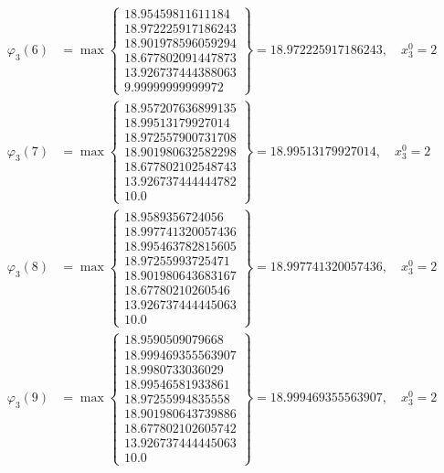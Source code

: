 \documentclass{article}
\begin{document}
\begin{align*}
  
\varphi_{3}(6) &= \max \left\{ \begin{array}{c}
18.95459811611184 \\
 18.972225917186243 \\
 18.901978596059294 \\
 18.677802091447873 \\
 13.926737444388063 \\
 9.99999999999972
\end{array} \right\} = 18.972225917186243, \quad x_{3}^0 = 2\\
  
  
  
  
\varphi_{3}(7) &= \max \left\{ \begin{array}{c}
18.957207636899135 \\
 18.99513179927014 \\
 18.972557900731708 \\
 18.901980632582298 \\
 18.677802102548743 \\
 13.926737444444782 \\
 10.0
\end{array} \right\} = 18.99513179927014, \quad x_{3}^0 = 2\\
  
  
  
  
\varphi_{3}(8) &= \max \left\{ \begin{array}{c}
18.9589356724056 \\
 18.997741320057436 \\
 18.995463782815605 \\
 18.97255993725471 \\
 18.901980643683167 \\
 18.67780210260546 \\
 13.926737444445063 \\
 10.0
\end{array} \right\} = 18.997741320057436, \quad x_{3}^0 = 2\\
  
  
  
  
\varphi_{3}(9) &= \max \left\{ \begin{array}{c}
18.9590509079668 \\
 18.999469355563907 \\
 18.9980733036029 \\
 18.99546581933861 \\
 18.97255994835558 \\
 18.901980643739886 \\
 18.677802102605742 \\
 13.926737444445063 \\
 10.0
\end{array} \right\} = 18.999469355563907, \quad x_{3}^0 = 2\\
  

\end{align*}
\end{document}

